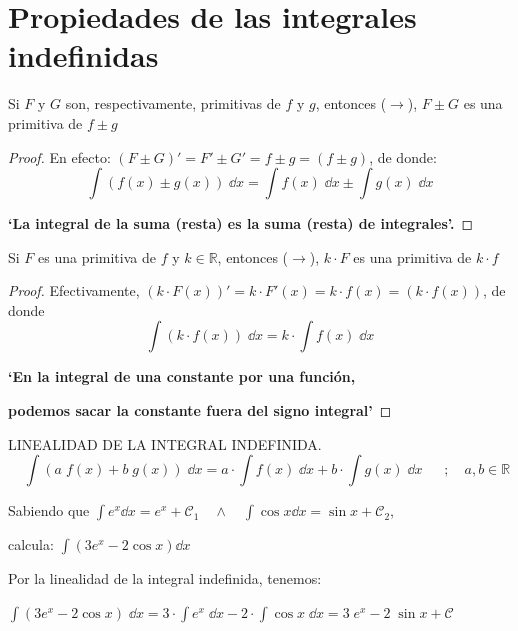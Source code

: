 	\section{Propiedades de las integrales indefinidas}
	
	\begin{teor}
	Si $F$ y $G$ son, respectivamente, primitivas de $f$ y $g$, entonces ($\to $), $F\pm G$ es una primitiva de $f \pm g$	
	\end{teor}
	\begin{proof}
		En efecto: $(F \pm G)'=F' \pm G'=f \pm g=(f\pm g)$, de donde:
		\begin{equation}
			\int (f(x)\pm g(x))\; \dd x = \int f(x)\; \dd x \pm \int g(x)\; \dd x 
		\end{equation}
	\centerline {\textbf{`La integral de la suma (resta) es la suma (resta) de integrales'.}	}
	\end{proof}
	
	\begin{teor}
	Si $F$ es una primitiva de $f$ y $ k\in \mathbb R$, entonces ($\to$), $k\cdot F$ es una primitiva de $k\cdot f$
	\end{teor}
	\begin{proof}
		Efectivamente, $(k\cdot F(x))'=k\cdot F'(x)=k\cdot f(x)=(k\cdot f(x))$, de donde
		\begin{equation}
			\int (k\cdot f(x))\; \dd x= k\cdot \int f(x)\; \dd x
		\end{equation}
		\centerline {\textbf{`En la integral de una constante por una función,}}
		\centerline {\textbf{podemos sacar la constante fuera del signo integral'}}
	\end{proof}
	\begin{teor} {LINEALIDAD DE LA INTEGRAL INDEFINIDA.}
	\label{linealidad-II}
		\begin{equation}
			\boxed{	\quad \int \left( a\; f(x)+ b\; g(x) \right) \; \dd x = a\cdot \int f(x) \; \dd x + b\cdot \int g(x) \; \dd x 	\quad}\; \; ; \quad a,b\in\mathbb R 
		\end{equation}
	\end{teor}
	
	\begin{ejem} Sabiendo que $\int e^x \dd x =e^x + \mathcal C_1 \quad \wedge \quad \int \cos x \dd x=\sin x + \mathcal C_2$, 
	
	calcula:  $\int (3e^x-2\cos x) \dd x$ 
	
	
	Por la linealidad de la integral indefinida, tenemos:
		
	$\int (3e^x-2\cos x) \; \dd x = 3 \cdot \int e^x \; \dd x - 2 \cdot  \int \cos x \; \dd x = 3\; e^x -2 \;  \sin x + \mathcal C$ 
	\end{ejem}
	
